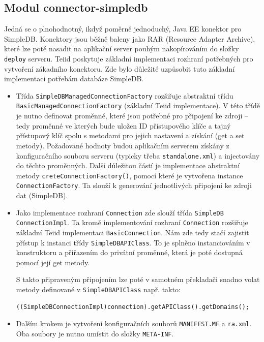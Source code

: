 \documentclass[oneside,12pt,final]{fithesis2}
\begin{document}
\subsection{Modul connector-simpledb}
\label{connector-simpledb}
Jedná se o plnohodnotný, ikdyž poměrně jednoduchý, Java EE konektor pro SimpleDB. Konektory jsou běžně baleny jako RAR (Resource Adapter Archive), které lze poté nasadit na aplikační server pouhým nakopírováním do složky \texttt{deploy} serveru. Teiid poskytuje základní implementaci rozhraní potřebných pro vytvoření zákadního konektoru. Zde bylo důležité uzpůsobit tuto základní implementaci potřebám databáze SimpleDB. 
\begin{itemize}
 \item Třída \texttt{SimpleDBManagedConnectionFactory} rozšiřuje abstraktní třídu \texttt{BasicManagedConnectionFactory} (základní Teiid implementace). V této třídě je nutno definovat proměnné, které jsou potřebné pro připojení ke zdroji -- tedy proměnné ve kterých bude uložen ID přístupového klíče a tajný přístupový klíč spolu s metodami pro jejich nastavení a získání (get a set metody). Požadované hodnoty budou aplikačním serverem získány z konfiguračního souboru serveru (typicky třeba \texttt{standalone.xml}) a injectovány do těchto proměnných. Další důležitou částí je implementace abstraktní metody \texttt{creteConnectionFactory()}, pomocí které je vytvořena instance \texttt{ConnectionFactory}. Ta slouží k generování jednotlivých připojení ke zdroji dat (SimpleDB).
 \item Jako implementace rozhraní \texttt{Connection} zde slouží třída \texttt{SimpleDB ConnectionImpl}. Ta kromě implementování rozhraní \texttt{Connection} rozšiřuje základní Teiid implementaci \texttt{BasicConnection}. Nám zde tedy stačí zajistit přístup k instanci třídy \texttt{SimpleDBAPIClass}. To je splněno instanciováním v konstruktoru a přiřazením do privátní proměnné, která je poté dostupná pomocí její get metody.
 
 S takto připraveným připojením lze poté v samotném překladači snadno volat metody definované v \texttt{SimpleDBAPIClass} např. takto:
 \begin{Verbatim}[fontsize=\small]
((SimpleDBConnectionImpl)connection).getAPIClass().getDomains();
 \end{Verbatim}
 \item Dalším krokem je vytvoření konfiguračních souborů \texttt{MANIFEST.MF} a \texttt{ra.xml}. Oba soubory je nutno umístit do složky \texttt{META-INF}. 
 

\end{itemize}
\end{document}
